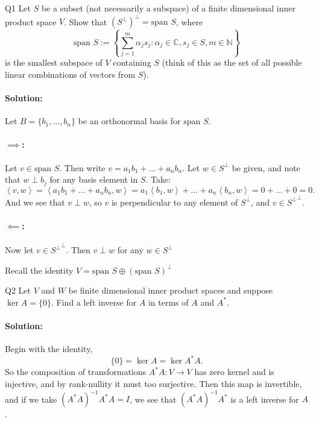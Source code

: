 \documentclass{article}
\begin{document}
\begin{prob}{Q1}
Let $S$ be a subset (not necessarily a subspace) of a finite dimensional inner product space $V$. Show that $(S^\perp)^\perp = \text{span } S$, where
$$\text{span } S := \left\{\sum_{j=1}^m \alpha_j s_j : \alpha_j \in \mathbb{C}, s_j \in S, m \in \mathbb{N}\right\}$$
is the smallest subspace of $V$ containing $S$ (think of this as the set of all possible linear combinations of vectors from $S$).
\end{prob}
\paragraph{Solution: }Let $B=\{b_1,\dots,b_n\} $ be an orthonormal basis for $\text{span } S$.

\paragraph{$\implies$:} Let $v\in \text{span }S$. Then write $v=a_1b_1+\dots+a_nb_n$. Let $w\in S^{\perp}$ be given, and note that $w\perp b_j$ for any basis element in $S$. Take:
\[ \left<v,w \right> =  \left< a_1b_1+\dots+a_nb_n,w\right> = a_1\left< b_1,w\right>+\dots+a_n\left<b_n ,w\right> =  0+\dots+0=0 .\] 
And we see that $v\perp w$, so $v$ is perpendicular to any element of $S^{\perp}$, and $v\in {S^{\perp}}^{\perp}$.
\paragraph{$\impliedby$:} Now let $v\in {S^{\perp}}^{\perp}$. Then $v\perp w$ for any $w\in S^{\perp}$

Recall the identity $V=\text{span } S \oplus (\text{span } S)^{\perp} $

\begin{prob}{Q2}
Let $V$ and $W$ be finite dimensional inner product spaces and suppose $\ker A = \{0\}$. Find a left inverse for $A$ in terms of $A$ and $A^*$.
\end{prob}

\paragraph{Solution: } Begin with the identity,
\[ \{0\} =\ker A =\ker A^* A .\] 
So the composition of transformations $A^* A:V\to V$ has zero kernel and is injective, and by rank-nullity it must too surjective. Then this map is invertible, and if we take $(A^* A)^{-1}A^* A=I$, we see that $(A^* A)^{-1}A^* $ is a left inverse for $A$.
\end{document}
